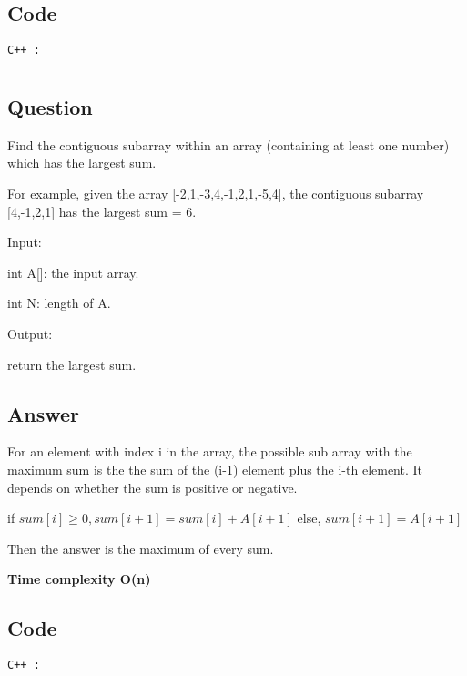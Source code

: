 \subsection{Code}
\texttt{C++ :}


\newpage
\section{}
\subsection{Question}
Find the contiguous subarray within an array (containing at least one number) which has the largest sum.

For example, given the array [-2,1,-3,4,-1,2,1,-5,4], the contiguous subarray [4,-1,2,1] has the largest sum = 6.

Input:

int A[]: the input array.

int N: length of A.

Output:

return the largest sum.

\subsection{Answer}
For an element with index i in the array, the possible sub array with the maximum sum is the the sum of the (i-1) element plus the i-th element. It depends on whether the sum is positive or negative.

if $sum[i]\ge0,sum[i+1]=sum[i]+A[i+1]$
else, $sum[i+1]=A[i+1]$

Then the answer is the maximum of every sum.

\textbf{\color{red}Time complexity O(n)}
\subsection{Code}
\texttt{C++ :}


